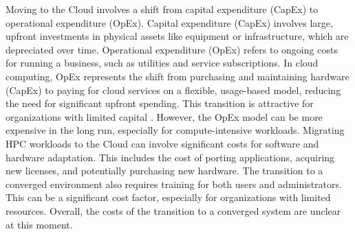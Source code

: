     Moving to the Cloud involves a shift from capital expenditure (CapEx) to operational expenditure (OpEx). Capital expenditure (CapEx) involves large, upfront investments in physical assets like equipment or infrastructure, which are depreciated over time. Operational expenditure (OpEx) refers to ongoing costs for running a business, such as utilities and service subscriptions. In cloud computing, OpEx represents the shift from purchasing and maintaining hardware (CapEx) to paying for cloud services on a flexible, usage-based model, reducing the need for significant upfront spending. This transition is attractive for organizations with limited capital \cite{netto_hpc_2019,varghese_next_2018,gill_taxonomy_2018,ahn_flux_2020,rodriguez_container-based_2019,netto_hpc_2019,gadban_analyzing_2021,gadban_investigating_2020}. However, the OpEx model can be more expensive in the long run, especially for compute-intensive workloads.
    Migrating HPC workloads to the Cloud can involve significant costs for software and hardware adaptation. This includes the cost of porting applications, acquiring new licenses, and potentially purchasing new hardware. The transition to a converged environment also requires training for both users and administrators. This can be a significant cost factor, especially for organizations with limited resources. Overall, the costs of the transition to a converged system are unclear at this moment.









